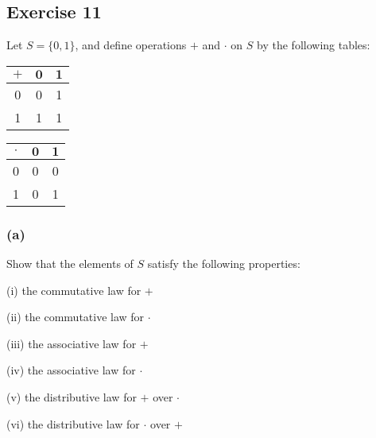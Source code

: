 \documentclass[14pt]{extarticle}
\begin{document}
\subsection{Exercise 11}
Let \(S = \{0, 1\}\), and define operations $+$ and $\cdot$ on $S$ by the following tables:

\begin{center}
  \begin{tabular}{c|cc}
    \(\bm{+}\) & \(\bm{0}\) & \(\bm{1}\) \\
    \hline
    0          & 0          & 1          \\
    1          & 1          & 1          \\
  \end{tabular}
  \hspace{2cm}
  \begin{tabular}{c|cc}
    \(\bm{\cdot}\) & \(\bm{0}\) & \(\bm{1}\) \\
    \hline
    0              & 0          & 0          \\
    1              & 0          & 1          \\
  \end{tabular}
\end{center}

\subsubsection{(a)}
Show that the elements of $S$ satisfy the following properties:

(i) the commutative law for $+$

(ii) the commutative law for $\cdot$

(iii) the associative law for $+$

(iv) the associative law for $\cdot$

(v) the distributive law for $+$ over $\cdot$

(vi) the distributive law for $\cdot$ over $+$
\end{document}
